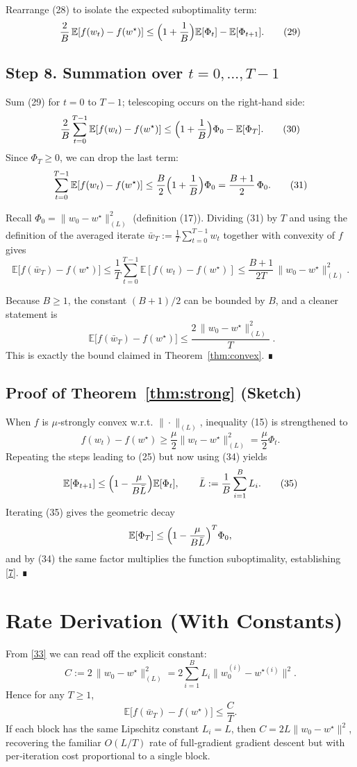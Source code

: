 \documentclass[11pt]{article}
\begin{document}
Rearrange (28) to isolate the expected suboptimality term:
\[
\frac{2}{B}\,\mathbb{E}[f(w_t)-f(w^\star)]
\le \Bigl(1+\frac{1}{B}\Bigr)\mathbb{E}[\Phi_t]-\mathbb{E}[\Phi_{t+1}].
\tag{29}
\]

\subsection*{Step 8. Summation over $t=0,\dots,T-1$}
Sum (29) for $t=0$ to $T-1$; telescoping occurs on the right‑hand side:
\[
\frac{2}{B}\sum_{t=0}^{T-1}\mathbb{E}[f(w_t)-f(w^\star)]
\le \Bigl(1+\frac{1}{B}\Bigr)\Phi_0-\mathbb{E}[\Phi_T].
\tag{30}
\]
Since $\Phi_T\ge0$, we can drop the last term:
\[
\sum_{t=0}^{T-1}\mathbb{E}[f(w_t)-f(w^\star)]
\le \frac{B}{2}\Bigl(1+\frac{1}{B}\Bigr)\Phi_0
= \frac{B+1}{2}\,\Phi_0 .
\tag{31}
\]

Recall $\Phi_0=\|w_0-w^\star\|_{(L)}^{2}$ (definition (17)).
Dividing (31) by $T$ and using the definition of the averaged iterate
$\bar w_T:=\frac1T\sum_{t=0}^{T-1}w_t$ together with convexity of $f$ gives
\[
\mathbb{E}\!\bigl[f(\bar w_T)-f(w^\star)\bigr]
\le \frac{1}{T}\sum_{t=0}^{T-1}\mathbb{E}[f(w_t)-f(w^\star)]
\le \frac{B+1}{2T}\,\|w_0-w^\star\|_{(L)}^{2}.
\tag{32}
\]

Because $B\ge1$, the constant $(B+1)/2$ can be bounded by $B$, and a cleaner
statement is
\[
\boxed{\;
\mathbb{E}\!\bigl[f(\bar w_T)-f(w^\star)\bigr]
\le \frac{2\,\|w_0-w^\star\|_{(L)}^{2}}{T}\; }.
\tag{33}
\]
This is exactly the bound claimed in Theorem~\ref{thm:convex}. ∎

\subsection*{Proof of Theorem~\ref{thm:strong} (Sketch)}
When $f$ is $\mu$‑strongly convex w.r.t. $\|\cdot\|_{(L)}$, inequality (15) is
strengthened to
\[
f(w_t)-f(w^\star)\ge \frac{\mu}{2}\|w_t-w^\star\|_{(L)}^{2}
= \frac{\mu}{2}\Phi_t .
\tag{34}
\]
Repeating the steps leading to (25) but now using (34) yields
\[
\mathbb{E}[\Phi_{t+1}]
\le \Bigl(1-\frac{\mu}{B\bar L}\Bigr)\mathbb{E}[\Phi_t],
\qquad
\bar L:=\frac{1}{B}\sum_{i=1}^{B}L_i .
\tag{35}
\]
Iterating (35) gives the geometric decay
\[
\mathbb{E}[\Phi_T]\le \Bigl(1-\frac{\mu}{B\bar L}\Bigr)^{T}\Phi_0,
\]
and by (34) the same factor multiplies the function suboptimality,
establishing \eqref{7}. ∎

\section{Rate Derivation (With Constants)}
From \eqref{33} we can read off the explicit constant:
\[
C:=2\,\|w_0-w^\star\|_{(L)}^{2}
=2\sum_{i=1}^{B}L_i\|w_0^{(i)}-w^{\star(i)}\|^{2}.
\]
Hence for any $T\ge1$,
\[
\mathbb{E}\!\bigl[f(\bar w_T)-f(w^\star)\bigr]\le \frac{C}{T}.
\]
If each block has the same Lipschitz constant $L_i=L$, then $C=2L\|w_0-w^\star\|^{2}$,
recovering the familiar $O(L/T)$ rate of full‑gradient gradient descent but
with per‑iteration cost proportional to a single block.
\end{document}
